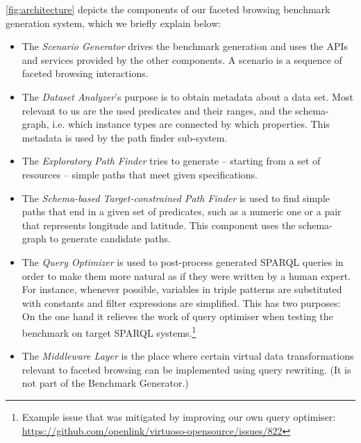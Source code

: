 \autoref{fig:architecture} depicts the components of our faceted browsing benchmark generation system, which we briefly explain below: 
\begin{itemize}
\item The \emph{Scenario Generator} drives the benchmark generation and uses the APIs and services provided by the other components.
A scenario is a sequence of faceted browsing interactions.
\item The \emph{Dataset Analyzer}'s purpose is to obtain metadata about a data set. Most relevant to us are the used predicates and their ranges, and the schema-graph, i.e. which instance types are connected by which properties.
This metadata is used by the path finder sub-system.
\item The \emph{Exploratory Path Finder} tries to generate -- starting from a set of resources -- simple paths that meet given specifications.
\item The \emph{Schema-based Target-constrained Path Finder} is used to find simple paths that end in a given set of predicates, such as a numeric one or a pair that represents longitude and latitude. This component uses the schema-graph to generate candidate paths. %
\item The \emph{Query Optimizer} is used to post-process generated SPARQL queries in order to make them more natural as if they were written by a human expert.
For instance, whenever possible, variables in triple patterns are substituted with constants and filter expressions are simplified. This has two purposes: On the one hand it relieves the work of query optimiser when testing the benchmark on target SPARQL systems.\footnote{Example issue that was mitigated by improving our own query optimiser: \\ \url{https://github.com/openlink/virtuoso-opensource/issues/822}}
\item The \emph{Middleware Layer} is the place where certain virtual data transformations relevant to faceted browsing can be implemented using query rewriting. (It is not part of the Benchmark Generator.) %

\end{itemize}
